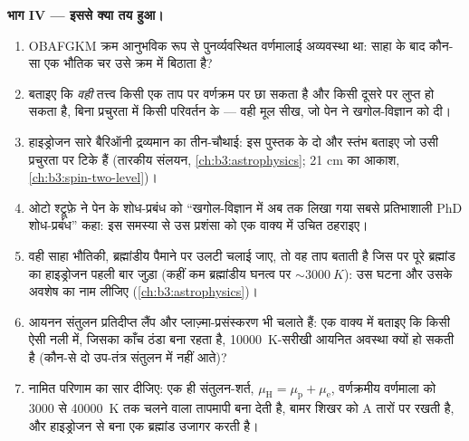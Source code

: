\begin{problem}[{सप्ताहांत समस्या --- साहा, पेन, और ब्रह्मांड
किससे बना है}]
\medskip\noindent\textbf{भाग IV --- इससे क्या तय हुआ।}
\begin{enumerate}[resume]
  \item OBAFGKM क्रम आनुभविक रूप से पुनर्व्यवस्थित वर्णमालाई
        अव्यवस्था था: साहा के बाद कौन-सा एक भौतिक चर उसे क्रम में
        बिठाता है?
  \item बताइए कि \emph{वही} तत्त्व किसी एक ताप पर वर्णक्रम पर छा
        सकता है और किसी दूसरे पर लुप्त हो सकता है, बिना प्रचुरता
        में किसी परिवर्तन के --- वही मूल सीख, जो पेन ने
        खगोल-विज्ञान को दी।
  \item हाइड्रोजन सारे बैरिऑनी द्रव्यमान का तीन-चौथाई: इस पुस्तक के
        दो और स्तंभ बताइए जो उसी प्रचुरता पर टिके हैं (तारकीय
        संलयन, \cref{ch:b3:astrophysics}; 21 cm का
        आकाश, \cref{ch:b3:spin-two-level})।
  \item ओटो श्ट्रूफ़े ने पेन के शोध-प्रबंध को ``खगोल-विज्ञान में अब
        तक लिखा गया सबसे प्रतिभाशाली PhD शोध-प्रबंध'' कहा: इस
        समस्या से उस प्रशंसा को एक वाक्य में उचित ठहराइए।
  \item वही साहा भौतिकी, ब्रह्मांडीय पैमाने पर उलटी चलाई जाए, तो
        वह ताप बताती है जिस पर पूरे ब्रह्मांड का हाइड्रोजन पहली बार
        जुड़ा (कहीं कम ब्रह्मांडीय घनत्व पर $\sim\qty{3000}{K}$):
        उस घटना और उसके अवशेष का नाम लीजिए
        (\cref{ch:b3:astrophysics})।
  \item आयनन संतुलन प्रतिदीप्त लैंप और प्लाज़्मा-प्रसंस्करण भी
        चलाते हैं: एक वाक्य में बताइए कि किसी ऐसी नली में, जिसका
        काँच ठंडा बना रहता है, \qty{10000}{K}-सरीखी आयनित अवस्था
        क्यों हो सकती है (कौन-से दो उप-तंत्र संतुलन में नहीं आते)?
  \item नामित परिणाम का सार दीजिए: एक ही संतुलन-शर्त,
        $\mu_{\text{H}} = \mu_{\text{p}} + \mu_{\text{e}}$,
        वर्णक्रमीय वर्णमाला को $3000$ से \qty{40000}{K} तक चलने
        वाला तापमापी बना देती है, बामर शिखर को A तारों पर रखती है,
        और हाइड्रोजन से बना एक ब्रह्मांड उजागर करती है।
\end{enumerate}
\end{problem}
